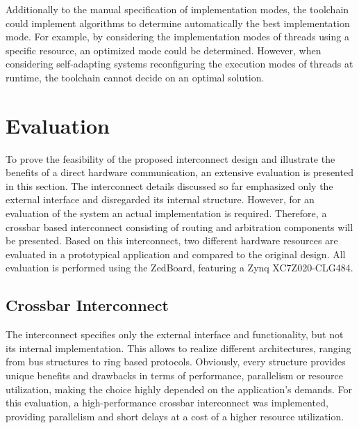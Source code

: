 Additionally to the manual specification of implementation modes, the
toolchain could implement algorithms to determine automatically the best
implementation mode. For example, by considering the implementation modes of
threads using a specific resource, an optimized mode could be determined.
However, when considering self-adapting systems reconfiguring the execution
modes of threads at runtime, the toolchain cannot decide on an optimal
solution.

\section{Evaluation}
To prove the feasibility of the proposed interconnect design and illustrate
the benefits of a direct hardware communication, an extensive evaluation is
presented in this section. The interconnect details discussed so far
emphasized only the external interface and disregarded its internal structure.
However, for an evaluation of the system an actual implementation is required.
Therefore, a crossbar based interconnect consisting of routing and arbitration
components will be presented. Based on this interconnect, two different
hardware resources are evaluated in a prototypical application and compared to
the original design. All evaluation is performed using the ZedBoard, featuring
a Zynq XC7Z020-CLG484.

\subsection{Crossbar Interconnect}
The interconnect specifies only the external interface and functionality, but
not its internal implementation. This allows to realize different
architectures, ranging from bus structures to ring based protocols. Obviously,
every structure provides unique benefits and drawbacks in terms of
performance, parallelism or resource utilization, making the choice highly
depended on the application's demands. For this evaluation, a high-performance
crossbar interconnect was implemented, providing parallelism and short delays
at a cost of a higher resource utilization.

